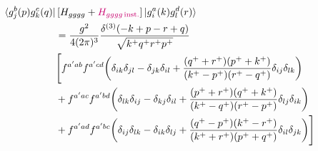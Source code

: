 \documentclass[a4paper,11pt]{article}
\begin{document}
\begin{itemize}
\begin{align}
   \bra{g^{b}_{j}(p)g^{c}_{k}(q)}&\left[H_{gggg}+{\color{chg}H_{gggg\,\text{inst.}}}\right] \ket{g^{a}_{i}(k)g^{d}_{l}(r)} \notag \\ &  = \frac{g^{2}}{4(2\pi)^{3}}\frac{\delta^{(3)}(-k+p-r+q)}{\sqrt{k^{+}q^{+}r^{+}p^{+}}}\notag \\ & \Bigg[f^{a'ab}f^{a'cd}\bigg(\delta_{ik}\delta_{jl}-\delta_{jk}\delta_{il}+\frac{(q^{+}+r^{+})(p^{+}+k^{+})}{(k^{+}-p^{+})(r^{+}-q^{+})}\delta_{ij}\delta_{lk}\bigg)\notag \\ & +f^{a'ac}f^{a'bd}\bigg(\delta_{lk}\delta_{ij}-\delta_{kj}\delta_{il}+\frac{(p^{+}+r^{+})(q^{+}+k^{+})}{(k^{+}-q^{+})(r^{+}-p^{+})}\delta_{lj}\delta_{ik}\bigg)\notag \\ & + f^{a'ad}f^{a'bc}\bigg(\delta_{ij}\delta_{lk}-\delta_{ik}\delta_{lj}+\frac{(q^{+}-p^{+})(k^{+}-r^{+})}{(k^{+}+r^{+})(p^{+}+q^{+})}\delta_{il}\delta_{jk}\bigg) \Bigg]
\end{align}
  \end{itemize}
\end{document}
